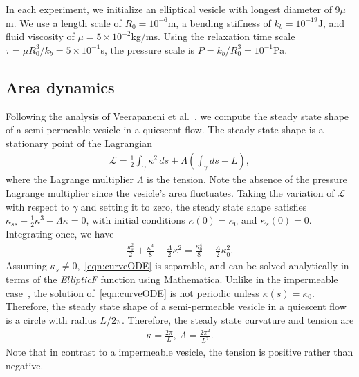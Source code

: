 \documentclass[9pt,twocolumn,twoside,lineno]{pnas-new}
\begin{document}
In each experiment, we initialize an elliptical vesicle with longest
diameter of 9$\mu$m. We use a length scale of $R_0 = 10^{-6}$m, a
bending stiffness of $k_b = 10^{-19}$J, and fluid viscosity of $\mu=5
\times 10^{-2}$kg/ms. Using the relaxation time scale $\tau = \mu
R_0^3/k_b = 5 \times 10^{-1}$s, the pressure scale is $P = k_b/R_0^3 =
10^{-1}$Pa. 



\subsection*{Area dynamics}
Following the analysis of Veerapaneni et al.~\cite{vee-raj-bir-pur2009},
we compute the steady state shape of a semi-permeable vesicle in a
quiescent flow. The steady state shape is a stationary point of the
Lagrangian
\begin{align}
  \mathcal{L} = \frac{1}{2}\int_{\gamma} \kappa^2 \, ds +
    \Lambda \left(\int_{\gamma} ds  - L \right),
\end{align}
where the Lagrange multiplier $\Lambda$ is the tension. Note the absence
of the pressure Lagrange multiplier since the vesicle's area fluctuates.
Taking the variation of $\mathcal{L}$ with respect to $\gamma$ and
setting it to zero, the steady state shape satisfies $\kappa_{ss} +
\frac{1}{2}\kappa^3 - \Lambda \kappa = 0$, with initial conditions
$\kappa(0) = \kappa_0$ and $\kappa_s(0) = 0$.  Integrating once, we have
\begin{align}
  \frac{\kappa_s^2}{2} + \frac{\kappa^4}{8} - 
    \frac{\Lambda}{2}\kappa^2 = \frac{\kappa_0^4}{8} - 
    \frac{\Lambda}{2}\kappa_0^2.
  \label{eqn:curveODE}
\end{align}
Assuming $\kappa_s \neq 0$,~\eqref{eqn:curveODE} is separable, and can
be solved analytically in terms of the {\em EllipticF} function using
Mathematica. Unlike in the impermeable case~\cite{vee-raj-bir-pur2009},
the solution of~\eqref{eqn:curveODE} is not periodic unless $\kappa(s) =
\kappa_0$. Therefore, the steady state shape of a semi-permeable vesicle
in a quiescent flow is a circle with radius $L/2\pi$. Therefore, the
steady state curvature and tension are
\begin{align}
  \kappa = \frac{2\pi}{L}, \: \Lambda = \frac{2\pi^2}{L^2}.
  \label{eqn:SSshape}
\end{align}
Note that in contrast to a impermeable vesicle, the tension is positive
rather than negative.
\end{document}
